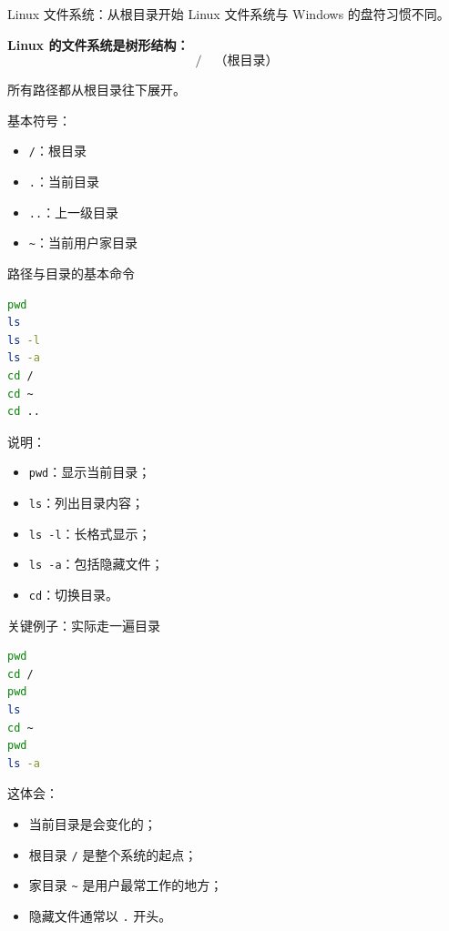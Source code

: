 \documentclass[aspectratio=169]{beamer}
\begin{document}
\begin{frame}{Linux 文件系统：从根目录开始}
Linux 文件系统与 Windows 的盘符习惯不同。

\vspace{0.5em}
\textbf{Linux 的文件系统是树形结构：}
\[
/ \quad \text{（根目录）}
\]

所有路径都从根目录往下展开。

\vspace{0.5em}
基本符号：
\begin{itemize}
  \item \texttt{/}：根目录
  \item \texttt{.}：当前目录
  \item \texttt{..}：上一级目录
  \item \texttt{\textasciitilde}：当前用户家目录
\end{itemize}
\end{frame}

\begin{frame}[fragile]{路径与目录的基本命令}
\begin{lstlisting}[language=bash]
pwd
ls
ls -l
ls -a
cd /
cd ~
cd ..
\end{lstlisting}

\vspace{0.5em}
说明：
\begin{itemize}
  \item \texttt{pwd}：显示当前目录；
  \item \texttt{ls}：列出目录内容；
  \item \texttt{ls -l}：长格式显示；
  \item \texttt{ls -a}：包括隐藏文件；
  \item \texttt{cd}：切换目录。
\end{itemize}
\end{frame}

\begin{frame}[fragile]{关键例子：实际走一遍目录}
\begin{lstlisting}[language=bash]
pwd
cd /
pwd
ls
cd ~
pwd
ls -a
\end{lstlisting}

这体会：
\begin{itemize}
  \item 当前目录是会变化的；
  \item 根目录 \texttt{/} 是整个系统的起点；
  \item 家目录 \texttt{\textasciitilde} 是用户最常工作的地方；
  \item 隐藏文件通常以 \texttt{.} 开头。
\end{itemize}
\end{frame}
\end{document}
